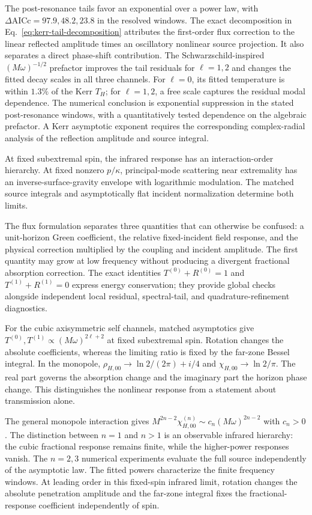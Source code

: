 \documentclass[aps,prd,twocolumn,10pt,nofootinbib,superscriptaddress,floatfix]{revtex4-2}
\begin{document}
The post-resonance tails favor an exponential over a power law, with
$\Delta\mathrm{AICc}=97.9,48.2,23.8$ in the resolved windows.
The exact decomposition in Eq.~\eqref{eq:kerr-tail-decomposition} attributes
the first-order flux correction to the linear reflected amplitude times
an oscillatory nonlinear source projection.  It also separates a direct
phase-shift contribution.  The Schwarzschild-inspired
$(M\omega)^{-1/2}$ prefactor improves the tail residuals for $\ell=1,2$
and changes the fitted decay scales in all three channels.
For $\ell=0$, its fitted temperature is within $1.3\%$ of the Kerr $T_H$;
for $\ell=1,2$, a free scale captures the residual modal dependence.
The numerical conclusion is exponential suppression in the stated
post-resonance windows, with a quantitatively tested dependence on the
algebraic prefactor.  A Kerr asymptotic exponent requires the corresponding
complex-radial analysis of the reflection amplitude and source integral.

At fixed subextremal spin, the infrared response has an interaction-order
hierarchy.  At fixed nonzero $p/\kappa$, principal-mode scattering near
extremality has an inverse-surface-gravity envelope with logarithmic
modulation.  The matched source integrals and asymptotically flat incident
normalization determine both limits.

The flux formulation separates three quantities that can otherwise be
confused: a unit-horizon Green coefficient, the relative fixed-incident field
response, and the physical correction multiplied by the coupling and incident
amplitude.  The first quantity may grow at low frequency without producing a
divergent fractional absorption correction.  The exact identities
$T^{(0)}+R^{(0)}=1$ and $T^{(1)}+R^{(1)}=0$ express energy conservation;
they provide global checks alongside independent local residual,
spectral-tail, and quadrature-refinement diagnostics.

For the cubic axisymmetric self channels, matched asymptotics give
$T^{(0)},T^{(1)}\propto(M\omega)^{2\ell+2}$ at fixed subextremal spin.
Rotation changes the absolute coefficients, whereas the limiting ratio
is fixed by the far-zone Bessel integral.  In the monopole,
$\rho_{H,00}\to\ln2/(2\pi)+i/4$ and
$\chi_{H,00}\to\ln2/\pi$.  The real part governs the absorption change and
the imaginary part the horizon phase change.  This distinguishes the
nonlinear response from a statement about transmission alone.

The general monopole interaction gives
$M^{2n-2}\chi_{H,00}^{(n)}\sim c_n(M\omega)^{2n-2}$ with $c_n>0$.
The distinction between $n=1$ and $n>1$ is an observable infrared hierarchy:
the cubic fractional response remains finite, while the higher-power
responses vanish.  The $n=2,3$ numerical experiments evaluate the full source
independently of the asymptotic law.  The fitted powers characterize the
finite frequency windows.  At leading order in this fixed-spin infrared
limit, rotation changes the absolute penetration amplitude and the far-zone
integral fixes the fractional-response coefficient independently of spin.
\end{document}
